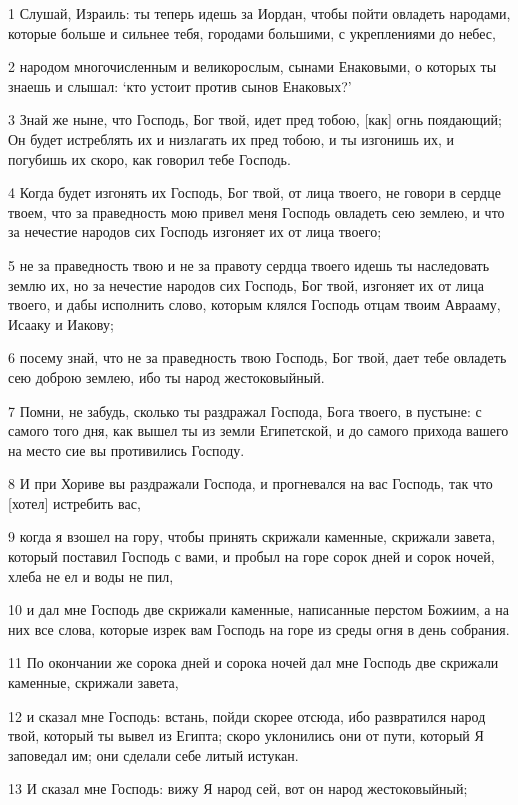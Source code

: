 \par 1 Слушай, Израиль: ты теперь идешь за Иордан, чтобы пойти овладеть народами, которые больше и сильнее тебя, городами большими, с укреплениями до небес,
\par 2 народом многочисленным и великорослым, сынами Енаковыми, о которых ты знаешь и слышал: `кто устоит против сынов Енаковых?'
\par 3 Знай же ныне, что Господь, Бог твой, идет пред тобою, [как] огнь поядающий; Он будет истреблять их и низлагать их пред тобою, и ты изгонишь их, и погубишь их скоро, как говорил тебе Господь.
\par 4 Когда будет изгонять их Господь, Бог твой, от лица твоего, не говори в сердце твоем, что за праведность мою привел меня Господь овладеть сею землею, и что за нечестие народов сих Господь изгоняет их от лица твоего;
\par 5 не за праведность твою и не за правоту сердца твоего идешь ты наследовать землю их, но за нечестие народов сих Господь, Бог твой, изгоняет их от лица твоего, и дабы исполнить слово, которым клялся Господь отцам твоим Аврааму, Исааку и Иакову;
\par 6 посему знай, что не за праведность твою Господь, Бог твой, дает тебе овладеть сею доброю землею, ибо ты народ жестоковыйный.
\par 7 Помни, не забудь, сколько ты раздражал Господа, Бога твоего, в пустыне: с самого того дня, как вышел ты из земли Египетской, и до самого прихода вашего на место сие вы противились Господу.
\par 8 И при Хориве вы раздражали Господа, и прогневался на вас Господь, так что [хотел] истребить вас,
\par 9 когда я взошел на гору, чтобы принять скрижали каменные, скрижали завета, который поставил Господь с вами, и пробыл на горе сорок дней и сорок ночей, хлеба не ел и воды не пил,
\par 10 и дал мне Господь две скрижали каменные, написанные перстом Божиим, а на них все слова, которые изрек вам Господь на горе из среды огня в день собрания.
\par 11 По окончании же сорока дней и сорока ночей дал мне Господь две скрижали каменные, скрижали завета,
\par 12 и сказал мне Господь: встань, пойди скорее отсюда, ибо развратился народ твой, который ты вывел из Египта; скоро уклонились они от пути, который Я заповедал им; они сделали себе литый истукан.
\par 13 И сказал мне Господь: вижу Я народ сей, вот он народ жестоковыйный;
